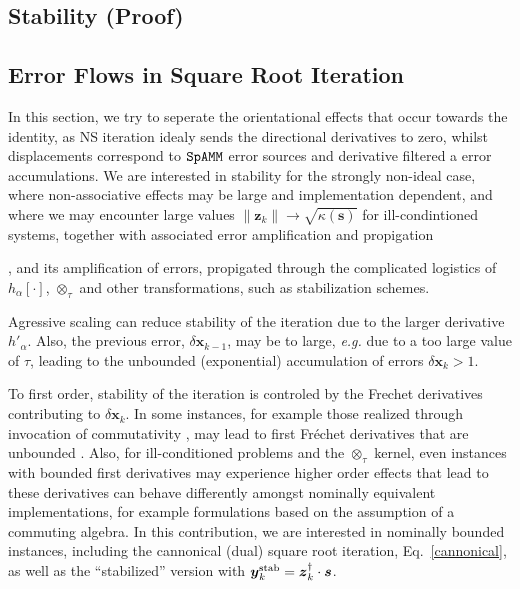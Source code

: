 \documentclass[letterpaper,twocolumn,amsmath,amsfont,amssymb,english,aps,jcp,preprintnumbers,groupaddress,nofootinbib,tightenlines]{revtex4}
\newcommand{\mat}[1]{\boldsymbol{#1}}
\newcommand{\ot}{ {\scriptstyle \otimes}_{ \tau } }
\begin{document}
\subsection{Stability (Proof)}


\subsection{Error Flows in Square Root Iteration}


In this section, we try to seperate the orientational effects that occur towards the identity, 
as NS iteration idealy sends the directional derivatives to zero, whilst displacements
correspond to $\tt SpAMM$ error sources and derivative filtered a error accumulations. 
We are interested in stability for the strongly non-ideal case, where non-associative effects may be 
large and implementation dependent, and where we may encounter large values 
$\lVert \mat{z}_{k} \rVert  \rightarrow \sqrt{\kappa\left(\mat{s} \right)}$ for ill-condintioned
systems, together with associated error amplification and propigation 


, 
and its amplification of errors, propigated through the complicated logistics of $h_\alpha[\cdot]$,  
$\ot$ and other transformations, such as stabilization schemes. 



Agressive scaling can reduce stability of the iteration due to the larger derivative $h'_\alpha$.  Also, the previous error, 
$\delta \mat{x}_{k-1}$, may be to large, {\em e.g.} due to a too large value of $\tau$,  leading to 
the unbounded (exponential) accumulation of errors $\delta \mat{x}_k > 1 $.  

To first order, stability of the 
iteration is controled by the Frechet derivatives contributing to $\delta \mat{x}_k$.    In some instances, 
for example those realized through invocation of commutativity \cite{}, may lead to first Fr\'{e}chet derivatives that are 
unbounded \cite{}.   Also, for ill-conditioned problems and the $\ot$ kernel, even instances with bounded first derivatives may experience higher order 
effects that lead to 
these derivatives can behave differently amongst nominally equivalent implementations, for example 
formulations based on the assumption of a commuting algebra.  
In this contribution, we are interested in nominally bounded instances, including the
cannonical (dual) square root iteration, Eq.~\ref{cannonical}, as well as the ``stabilized'' version 
with $\mat{y}^{\rm stab}_k = \mat{z}^\dagger_k \cdot \mat{s}$.  
\end{document}
